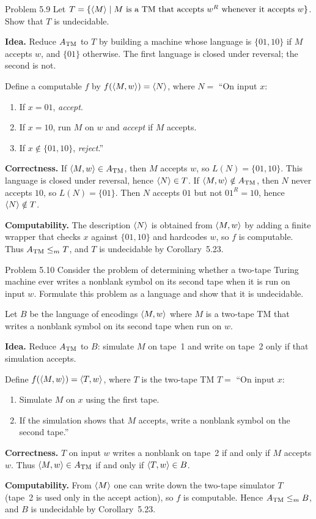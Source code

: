 \begin{question}{Problem 5.9}
Let $T=\{\langle M\rangle\mid \text{$M$ is a TM that accepts $w^R$ whenever it accepts $w$}\}$. Show that $T$ is undecidable.
\end{question}
\begin{soln}
\textbf{Idea.} Reduce $A_{\mathrm{TM}}$ to $T$ by building a machine whose language is $\{01,10\}$ if $M$ accepts $w$, and $\{01\}$ otherwise. The first language is closed under reversal; the second is not.

Define a computable $f$ by $f(\langle M,w\rangle)=\langle N\rangle$, where
$N=$ ``On input $x$:
\begin{enumerate}
\item If $x=01$, \emph{accept}.
\item If $x=10$, run $M$ on $w$ and \emph{accept} if $M$ accepts.
\item If $x\notin\{01,10\}$, \emph{reject}.''
\end{enumerate}

\textbf{Correctness.}
If $\langle M,w\rangle\in A_{\mathrm{TM}}$, then $M$ accepts $w$, so $L(N)=\{01,10\}$. This language is closed under reversal, hence $\langle N\rangle\in T$.
If $\langle M,w\rangle\notin A_{\mathrm{TM}}$, then $N$ never accepts $10$, so $L(N)=\{01\}$. Then $N$ accepts $01$ but not $01^R=10$, hence $\langle N\rangle\notin T$.

\textbf{Computability.} The description $\langle N\rangle$ is obtained from $\langle M,w\rangle$ by adding a finite wrapper that checks $x$ against $\{01,10\}$ and hardcodes $w$, so $f$ is computable. Thus $A_{\mathrm{TM}}\le_{m} T$, and $T$ is undecidable by Corollary~5.23.
\end{soln}

\begin{question}{Problem 5.10}
Consider the problem of determining whether a two-tape Turing machine ever writes a nonblank symbol on its second tape when it is run on input $w$. Formulate this problem as a language and show that it is undecidable.
\end{question}
\begin{soln}
Let $B$ be the language of encodings $\langle M,w\rangle$ where $M$ is a two-tape TM that writes a nonblank symbol on its second tape when run on $w$.

\textbf{Idea.} Reduce $A_{\mathrm{TM}}$ to $B$: simulate $M$ on tape~1 and write on tape~2 only if that simulation accepts.

Define $f(\langle M,w\rangle)=\langle T,w\rangle$, where $T$ is the two-tape TM
$T=$ ``On input $x$:
\begin{enumerate}
\item Simulate $M$ on $x$ using the first tape.
\item If the simulation shows that $M$ accepts, write a nonblank symbol on the second tape.''
\end{enumerate}

\textbf{Correctness.}
$T$ on input $w$ writes a nonblank on tape~2 if and only if $M$ accepts $w$. Thus $\langle M,w\rangle\in A_{\mathrm{TM}}$ if and only if $\langle T,w\rangle\in B$.

\textbf{Computability.} From $\langle M\rangle$ one can write down the two-tape simulator $T$ (tape~2 is used only in the accept action), so $f$ is computable. Hence $A_{\mathrm{TM}}\le_{m} B$, and $B$ is undecidable by Corollary~5.23.
\end{soln}

